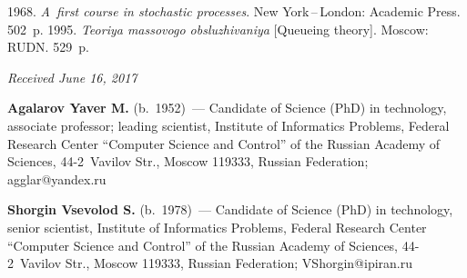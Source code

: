 \begin{multicols}{2}
{{\begin{thebibliography}{99}
 1968. \textit{A~first course in stochastic processes}. 
New York\,--\,London: Academic Press. 502~p.
 1995. \textit{Teoriya massovogo 
obsluzhivaniya} [Queueing theory]. Moscow: RUDN. 529~p.
\end{thebibliography}

 }
 }

\end{multicols}

\vspace*{-6pt}

\hfill{\small\textit{Received June 16, 2017}}

   
  
  \Contrl
  
   \noindent
   \textbf{Agalarov Yaver M.} (b.\ 1952)~--- Candidate of Science (PhD) in 
technology, associate professor; leading scientist, Institute of 
Informatics Problems, Federal Research Center ``Computer Science and 
Control'' of the Russian Academy of Sciences, 44-2~Vavilov Str., Moscow 
119333, Russian Federation; \mbox{agglar@yandex.ru}

\vspace*{3pt}


   \noindent
   \textbf{Shorgin Vsevolod S.} (b.\ 1978)~--- 
   Candidate of Science (PhD) in technology, senior scientist, 
   Institute of Informatics Problems, Federal Research Center 
   ``Computer Science and Control'' of the Russian Academy of Sciences, 
   44-2~Vavilov Str., Moscow 119333, Russian Federation; \mbox{VShorgin@ipiran.ru}



\label{end\stat}


\renewcommand{\bibname}{\protect\rm Литература} 
   